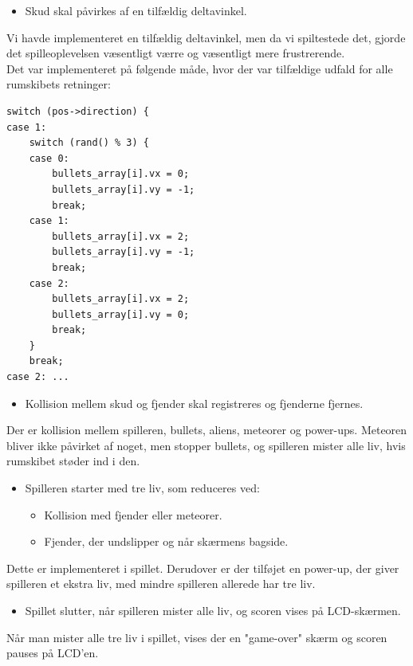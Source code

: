 \begin{itemize}
    \item Skud skal påvirkes af en tilfældig deltavinkel.
\end{itemize}
Vi havde implementeret en tilfældig deltavinkel, men da vi spiltestede det, gjorde det spilleoplevelsen væsentligt værre og væsentligt mere frustrerende. \\ Det var implementeret på følgende måde, hvor der var tilfældige udfald for alle rumskibets retninger:
\begin{lstlisting}[caption={Tilfældig deltavinkel kode}]
switch (pos->direction) {
case 1:
    switch (rand() % 3) {
    case 0:
        bullets_array[i].vx = 0;
        bullets_array[i].vy = -1;
        break;
    case 1:
        bullets_array[i].vx = 2;
        bullets_array[i].vy = -1;
        break;
    case 2:
        bullets_array[i].vx = 2;
        bullets_array[i].vy = 0;
        break;
    }
    break;
case 2: ...
\end{lstlisting}

\begin{itemize}
   \item Kollision mellem skud og fjender skal registreres og fjenderne fjernes.
\end{itemize}
Der er kollision mellem spilleren, bullets, aliens, meteorer og power-ups. Meteoren bliver ikke påvirket af noget, men stopper bullets, og spilleren mister alle liv, hvis rumskibet støder ind i den.

\begin{itemize}
    \item Spilleren starter med tre liv, som reduceres ved:
    \begin{itemize}
        \item Kollision med fjender eller meteorer.
        \item Fjender, der undslipper og når skærmens bagside.
    \end{itemize}
\end{itemize}
Dette er implementeret i spillet. Derudover er der tilføjet en power-up, der giver spilleren et ekstra liv, med mindre spilleren allerede har tre liv.

\begin{itemize}
    \item Spillet slutter, når spilleren mister alle liv, og scoren vises på LCD-skærmen.
\end{itemize}
Når man mister alle tre liv i spillet, vises der en "game-over" skærm og scoren pauses på LCD'en.

